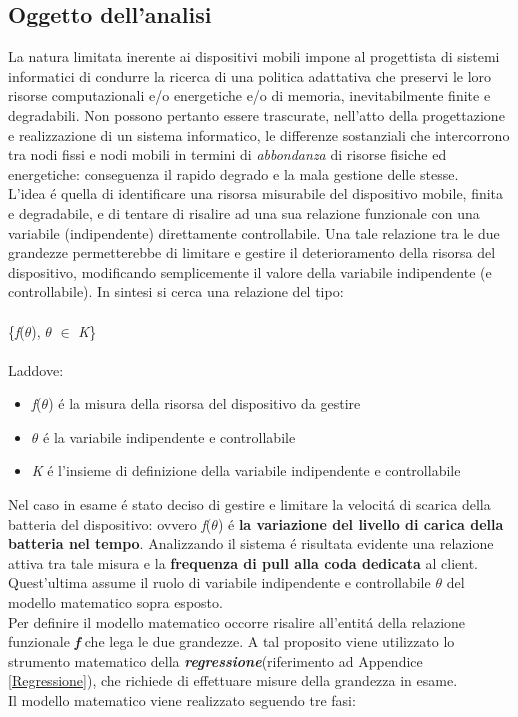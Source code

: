 \documentclass{article}
\begin{document}
\subsection{Oggetto dell'analisi}
La natura limitata inerente ai dispositivi mobili impone al progettista di sistemi informatici di condurre la ricerca di una politica adattativa che preservi le loro risorse computazionali e/o energetiche e/o di memoria, inevitabilmente finite e degradabili. Non possono pertanto essere trascurate, nell'atto della progettazione e realizzazione di un sistema informatico, le differenze sostanziali che intercorrono tra nodi fissi e nodi mobili in termini di \textit{abbondanza} di risorse fisiche ed energetiche: conseguenza il rapido degrado e la mala gestione delle stesse. 
\\
L'idea \'e quella di identificare una risorsa misurabile del dispositivo mobile, finita e degradabile, e di tentare di risalire ad una sua relazione funzionale con una variabile (indipendente) direttamente controllabile. Una tale relazione tra le due grandezze permetterebbe di limitare e gestire il deterioramento della risorsa del dispositivo, modificando semplicemente il valore della variabile indipendente (e controllabile). In sintesi si cerca una relazione del tipo: 
\\\\
\{\textit{f}(\(\theta\)), \(\theta\) \(\in\) \textit{K}\}
\\\\
Laddove:
\begin{itemize}
\item{\textit{f}(\(\theta\)) \'e la misura della risorsa del dispositivo da gestire}
\item{\(\theta\) \'e la variabile indipendente e controllabile}
\item{\textit{K} \'e l'insieme di definizione della variabile indipendente e controllabile}
\end{itemize}

Nel caso in esame \'e stato deciso di gestire e limitare la velocit\'a di scarica della batteria del dispositivo: ovvero \textit{f}(\(\theta\)) \'e \textbf{la variazione del livello di carica della batteria nel tempo}. Analizzando il sistema \'e risultata evidente una relazione attiva tra tale misura e la \textbf{frequenza di pull alla coda dedicata} al client. Quest'ultima assume il ruolo di variabile indipendente e controllabile \(\theta\) del modello matematico sopra esposto. 
\\
Per definire il modello matematico occorre risalire all'entit\'a della relazione funzionale \textbf{\textit{f}} che lega le due grandezze. A tal proposito viene utilizzato lo strumento matematico della \textbf{\textit{regressione}}(riferimento ad Appendice \ref{Regressione}), che richiede di effettuare misure della grandezza in esame.
\\
Il modello matematico viene realizzato seguendo tre fasi:
\end{document}
